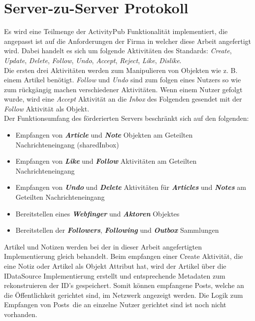 \section{Server-zu-Server Protokoll}
Es wird eine Teilmenge der ActivityPub Funktionalität implementiert, die angepasst ist auf die Anforderungen der Firma in welcher diese Arbeit angefertigt wird. Dabei handelt es sich um folgende Aktivitäten des Standards: \textit{Create}, \textit{Update}, \textit{Delete}, \textit{Follow}, \textit{Undo}, \textit{Accept}, \textit{Reject}, \textit{Like}, \textit{Dislike}.\\

Die ersten drei Aktivitäten werden zum Manipulieren von Objekten wie z. B. einem Artikel benötigt. \textit{Follow} und \textit{Undo} sind zum folgen eines Nutzers so wie zum rückgängig machen verschiedener Aktivitäten. Wenn einem Nutzer gefolgt wurde, wird eine \textit{Accept} Aktivität an die \textit{Inbox} des Folgenden gesendet mit der \textit{Follow} Aktivität als Objekt.\\

Der Funktionsumfang des förderierten Servers beschränkt sich auf den folgenden:
\begin{itemize}
	\item Empfangen von \textit{\textbf{Article}} und \textit{\textbf{Note}} Objekten am Geteilten Nachrichteneingang (sharedInbox)
	\item Empfangen von \textit{\textbf{Like}} und \textit{\textbf{Follow}} Aktivitäten am Geteilten Nachrichteneingang
	\item Empfangen von \textit{\textbf{Undo}} und \textit{\textbf{Delete}} Aktivitäten für \textit{\textbf{Articles}} und \textit{\textbf{Notes}} am Geteilten Nachrichteneingang 
	\item Bereitstellen eines \textit{\textbf{Webfinger}} und \textit{\textbf{Aktoren}} Objektes
	\item Bereitstellen der \textit{\textbf{Followers}}, \textit{\textbf{Following}} und \textit{\textbf{Outbox}} Sammlungen
\end{itemize}

Artikel und Notizen werden bei der in dieser Arbeit angefertigten Implementierung gleich behandelt. Beim empfangen einer Create Aktivität, die eine Notiz oder Artikel als Objekt Attribut hat, wird der Artikel über die IDataSource Implementierung erstellt und entsprechende Metadaten zum rekonstruieren der ID's gespeichert. Somit können empfangene \glqq Posts\grqq, welche an die Öffentlichkeit gerichtet sind, im Netzwerk angezeigt werden. Die Logik zum Empfangen von \glqq Posts\grqq~die an einzelne Nutzer gerichtet sind ist noch nicht vorhanden.\\

